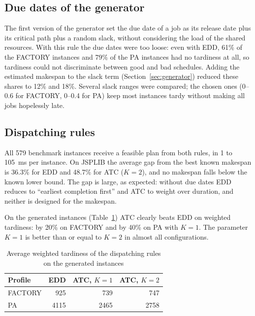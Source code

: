 \subsection{Due dates of the generator}
\label{sec:eval-generator}

The first version of the generator set the due date of a job as its release date plus its
critical path plus a random slack, without considering the load of the shared resources. With
this rule the due dates were too loose: even with EDD, 61\% of the FACTORY instances and 79\% of
the PA instances had no tardiness at all, so tardiness could not discriminate between good and
bad schedules. Adding the estimated makespan to the slack term
(Section~\ref{sec:generator}) reduced these shares to 12\% and 18\%. Several slack ranges were
compared; the chosen ones (0--0.6 for FACTORY, 0--0.4 for PA) keep most instances tardy without
making all jobs hopelessly late.

\subsection{Dispatching rules}
\label{sec:eval-rules}

All 579 benchmark instances receive a feasible plan from both rules, in 1 to 105~ms per
instance. On JSPLIB the average gap from the best known makespan is 36.3\% for EDD and 48.7\% for
ATC ($K=2$), and no makespan falls below the known lower bound. The gap is large, as expected:
without due dates EDD reduces to ``earliest completion first'' and ATC to weight over duration,
and neither is designed for the makespan.

On the generated instances (Table~\ref{tab:rules}) ATC clearly beats EDD on weighted tardiness:
by 20\% on FACTORY and by 40\% on PA with $K=1$. The parameter $K=1$ is better than or equal to
$K=2$ in almost all configurations.

\begin{table}[htpb]
  \centering
  \small
  \begin{tabular}{@{}lrrr@{}}
    \toprule
    \textbf{Profile} & \textbf{EDD} & \textbf{ATC, $K=1$} & \textbf{ATC, $K=2$} \\
    \midrule
    FACTORY & 925  & 739  & 747 \\
    PA      & 4115 & 2465 & 2758 \\
    \bottomrule
  \end{tabular}
  \caption{Average weighted tardiness of the dispatching rules on the generated instances}
  \label{tab:rules}
\end{table}

